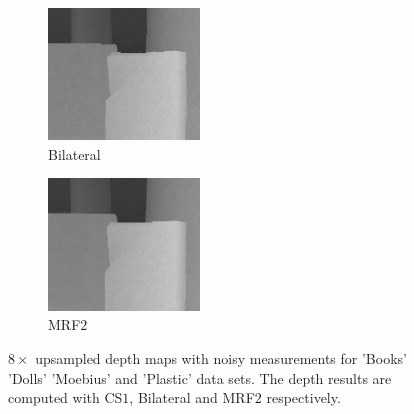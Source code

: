 \documentclass[preprint,10pt,5p,times,twocolumn]{elsarticle}
\begin{document}
\begin{figure}
\begin{subfigure}[b]{0.24\textwidth}
\includegraphics[height= 3.5cm, width=\textwidth]{fig_plastic_8X_noise_cvpr.png}
\caption*{Bilateral}
\end{subfigure}
\begin{subfigure}[b]{0.24\textwidth}
\includegraphics[height= 3.5cm, width=\textwidth]{fig_plastic_8X_noise_iccv.png}
\caption*{MRF$2$}
\end{subfigure}
\caption{$8\times$ upsampled depth maps with noisy measurements for 'Books' 'Dolls'  'Moebius' and 'Plastic' data sets. The depth results are computed with CS$1$, Bilateral and MRF$2$ respectively.}
\label{fig:exp2_fig}
\end{figure}
\end{document}
